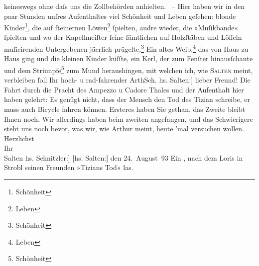 \begin{ledgroupsized}[t]{13cm}
               keineswegs ohne daſs uns die Zollbehörden anhielten.  – Hier haben wir in den paar
               Stunden unſres Aufenthaltes viel Schönheit und Leben geſehen: blonde Kinder\footnote{\noindent{}Schönheit}, die auf ſteinernen Löwen\footnote{\noindent{}Leben}{ }ſpielten, andre wieder, die »Muſikbande« ſpielten
               und wo der Kapellmeiſter ſeine ſämtlichen auf {\pb}Holzſtäben
               und Löffeln muſicirenden Untergebenen jä{\geminationm}erlich
                  prügelte.\footnote{\noindent{}Schönheit} Ein altes Weib,\footnote{\noindent{}Leben} das von Haus zu Haus ging und die kleinen Kinder küſſte, ein Kerl, der zum
               Fenſter hinausſchaute und dem Strümpfe\footnote{\noindent{}Schönheit} zum Mund heraushingen, mit welchen ich, wie \textsc{Salten} meint, verbleiben ſoll\pend
           \pstart Ihr hoch- u rad-fahrender \spacefill\mbox{ArthSch.}\pend{}\pstart
           \noindent{}{\pb}{[}hs. Salten:{]} lieber Freund! Die Fahrt durch die Pracht des Ampezzo u Cadore Thales
               und der Aufenthalt hier haben gelehrt: Es genügt nicht, dass der Mensch den Tod des Tizian schreibe, er muss auch Bicycle
               fahren können. Ersteres haben Sie gethan, das Zweite bleibt Ihnen noch. Wir
               allerdings haben beim zweiten angefangen, und das Schwierigere steht uns noch bevor,
               was wir, wie Arthur meint, heute ’mal versuchen wollen.\pend
           \pstart
           Herzlichst{\\}Ihr{\\}\spacefill\mbox{Salten}\pend
           \pstart
           \noindent{}{[}hs. Schnitzler:{]} \label{T_L00259-1v}\label{T_L00259-1h}\pend
           \pstart
           {[}hs. Salten:{]} den 24. August 93\pend
           \pstart
           Ein \label{K_L00259-1v}\label{K_L00259-1h}, nach dem Loris in Strobl seinen Freunden
                  »Tizians Tod« las.\pend
           

\end{ledgroupsized}
